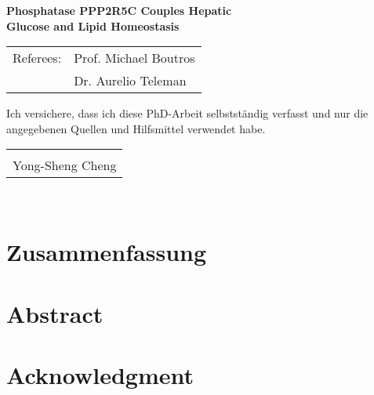\documentclass[
     12pt,         %
     a4paper,      %
     BCOR10mm,     %
     DIV14,        %
     listof=totoc,   %
     bibliography=totoc,     %
     index=totoc,     %
     ]{scrreprt}   %
\makeatletter
\newcommand{\sign}[1]{%
  \begin{tabular}[t]{@{}l@{}}
  \makebox[2in]{\hrulefill}\\
  \strut#1\strut
  \end{tabular}%
}
\newcommand{\blankpage}{
\newpage
\thispagestyle{empty}
\mbox{}
\addtocounter{page}{-1}%
\newpage
}
\makeatother
\begin{document}
\begin{titlepage}
\begin{center}
\vspace{0.5\baselineskip}
{\Large \textbf{
Phosphatase PPP2R5C Couples Hepatic\\
\vspace{0.5cm}
Glucose and Lipid Homeostasis}
}

\vfill 
{\large
\begin{tabular}[l]{ll}
Referees: & Prof. Michael Boutros\\
          & Dr. Aurelio Teleman\\
\end{tabular}
}
\end{center}

\end{titlepage}

\blankpage


\onehalfspacing


\vspace*{100pt}
Ich versichere, dass ich diese PhD-Arbeit selbstständig verfasst und nur die angegebenen
Quellen und Hilfsmittel verwendet habe.

\vspace*{50pt}

\sign{Yong-Sheng Cheng}\\

\blankpage

\chapter*{Zusammenfassung}


\blankpage

\chapter*{Abstract}


\blankpage

\chapter*{Acknowledgment}


\blankpage

\tableofcontents
\cleardoublepage
\end{document}
